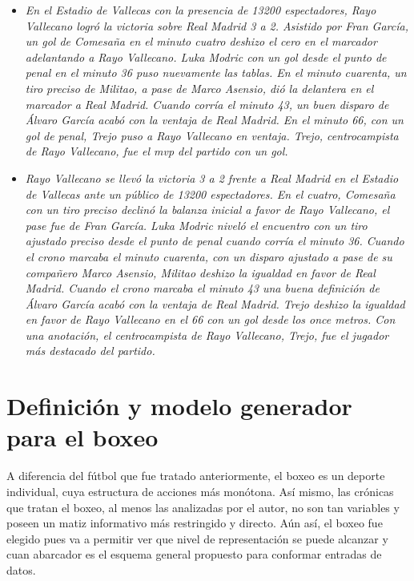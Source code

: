 \begin{itemize}
    \item \textit{En el Estadio de Vallecas con la presencia de 13200 espectadores, Rayo Vallecano logró la victoria sobre Real Madrid 3 a 2.
    Asistido por Fran García, un gol de Comesaña en el minuto cuatro deshizo el cero en el marcador adelantando a Rayo Vallecano. Luka Modric con un gol desde el punto de penal en el minuto 36 puso nuevamente las tablas. En el minuto cuarenta, un tiro preciso de Militao, a pase de Marco Asensio, dió la delantera en el marcador a Real Madrid. Cuando corría el minuto 43, un buen disparo de Álvaro García acabó con la ventaja de Real Madrid. En el minuto 66, con un gol de penal, Trejo puso a Rayo Vallecano en ventaja.
    Trejo, centrocampista de Rayo Vallecano, fue el mvp del partido con un gol.}
    \item \textit{Rayo Vallecano se llevó la victoria 3 a 2 frente a Real Madrid en el Estadio de Vallecas ante un público de 13200 espectadores.
    En el cuatro, Comesaña con un tiro preciso declinó la balanza inicial a favor de Rayo Vallecano, el pase fue de Fran García. Luka Modric niveló el encuentro con un tiro ajustado preciso desde el punto de penal cuando corría el minuto 36. Cuando el crono marcaba el minuto cuarenta, con un disparo ajustado a pase de su compañero Marco Asensio, Militao deshizo la igualdad en favor de Real Madrid. Cuando el crono marcaba el minuto 43 una buena definición de Álvaro García acabó con la ventaja de Real Madrid. Trejo deshizo la igualdad en favor de Rayo Vallecano en el 66 con un gol desde los once metros.
    Con una anotación, el centrocampista de Rayo Vallecano, Trejo, fue el jugador más destacado del partido.}
\end{itemize}


\section{Definición y modelo generador para el boxeo}

    A diferencia del fútbol que fue tratado anteriormente, el boxeo es un deporte individual, cuya estructura de acciones más monótona. Así mismo, 
las crónicas que tratan el boxeo, al menos las analizadas por el autor, no son tan variables y poseen un matiz informativo más restringido y directo. 
Aún así, el boxeo fue elegido pues va a permitir ver que nivel de representación se puede alcanzar y cuan abarcador es el esquema general 
propuesto para conformar entradas de datos.

